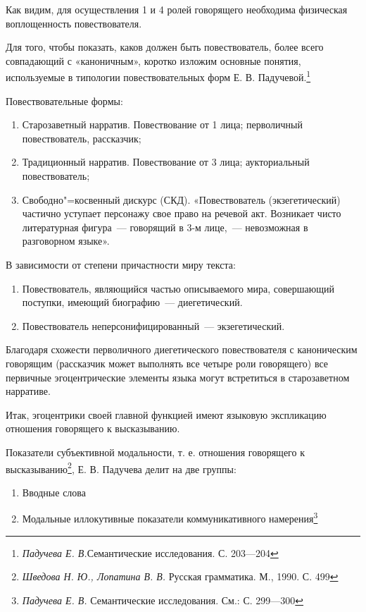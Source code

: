 \documentclass{kursa4}
\begin{document}
      \bigskip

      Как видим, для осуществления 1 и 4 ролей говорящего необходима физическая воплощенность повествователя. 

      Для того, чтобы показать, каков должен быть повествователь, более всего совпадающий с «каноничным», коротко изложим основные понятия, используемые в типологии повествовательных форм Е. В. Падучевой.\footnote{\textit{Падучева Е. В.}Семантические исследования. С. 203—204} \newline

      Повествовательные формы:
      \begin{enumerate}
        \item Старозаветный нарратив. Повествование от 1 лица; перволичный повествователь, рассказчик; 
        \item Традиционный нарратив. Повествование от 3 лица; аукториальный повествователь; \item Свободно"=косвенный дискурс (СКД). «Повествователь (экзегетический) частично уступает персонажу свое право на речевой акт. Возникает чисто литературная фигура~--- говорящий в 3-м лице,~--- невозможная в разговорном языке». \end{enumerate}

      В зависимости от степени причастности миру текста: \begin{enumerate}
        \item Повествователь, являющийся частью описываемого мира, совершающий поступки, имеющий биографию~--- диегетический. 
        \item Повествователь неперсонифицированный~--- экзегетический. 
       \end{enumerate} 

      Благодаря схожести перволичного диегетического повествователя с каноническим говорящим (рассказчик может выполнять все четыре роли говорящего) все первичные эгоцентрические элементы языка могут встретиться в старозаветном нарративе. 

      Итак, эгоцентрики своей главной функцией имеют языковую экспликацию отношения говорящего к высказыванию. 

      Показатели субъективной модальности, т. е. отношения говорящего к высказыванию\footnote{\textit{ Шведова Н. Ю., Лопатина В. В.} Русская грамматика. М., 1990. С. 499}, Е. В. Падучева делит на две группы: 

      \begin{enumerate}
        \item Вводные слова \item Модальные иллокутивные показатели коммуникативного намерения\footnote{\textit{Падучева Е. В.} Семантические исследования. См.: С. 299—300}        
      \end{enumerate}
\end{document}
